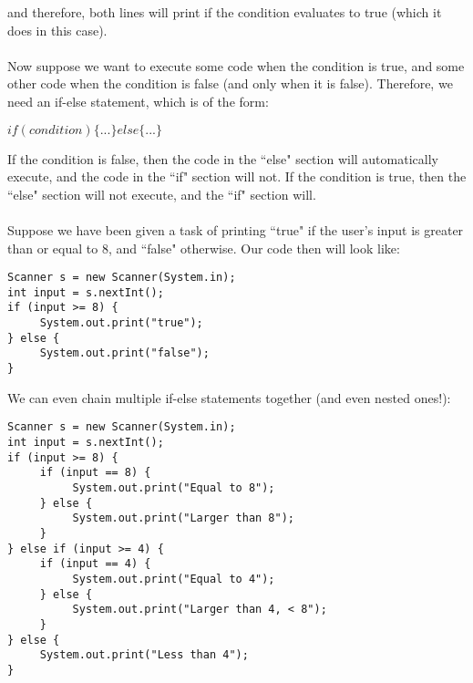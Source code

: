 and therefore, both lines will print if the condition evaluates to true (which it does in this case).
\\ \\
Now suppose we want to execute some code when the condition is true, and some other code when the condition is false (and only when it is false). Therefore, we need an if-else statement, which is of the form:
\begin{center}
$if(condition) \{...\} else \{...\}$
\end{center}
If the condition is false, then the code in the ``else" section will automatically execute, and the code in the ``if" section will not. If the condition is true, then the ``else" section will not execute, and the ``if" section will.
\\ \\
Suppose we have been given a task of printing ``true" if the user's input is greater than or equal to 8, and ``false" otherwise. Our code then will look like:
\begin{lstlisting}
Scanner s = new Scanner(System.in);
int input = s.nextInt();
if (input >= 8) {
     System.out.print("true");
} else {
     System.out.print("false");
}
\end{lstlisting}
We can even chain multiple if-else statements together (and even nested ones!):
\begin{lstlisting}
Scanner s = new Scanner(System.in);
int input = s.nextInt();
if (input >= 8) {
     if (input == 8) {
          System.out.print("Equal to 8");
     } else {
          System.out.print("Larger than 8");
     }
} else if (input >= 4) {
     if (input == 4) {
          System.out.print("Equal to 4");
     } else {
          System.out.print("Larger than 4, < 8");
     }
} else {
     System.out.print("Less than 4");
}
\end{lstlisting}

